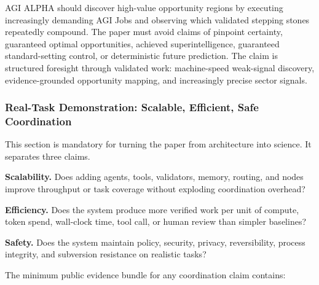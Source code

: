 AGI ALPHA should discover high-value opportunity regions by executing
increasingly demanding AGI Jobs and observing which validated stepping
stones repeatedly compound. The paper must avoid claims of pinpoint
certainty, guaranteed optimal opportunities, achieved superintelligence,
guaranteed standard-setting control, or deterministic future prediction.
The claim is structured foresight through validated work: machine-speed
weak-signal discovery, evidence-grounded opportunity mapping, and
increasingly precise sector signals.

\subsubsection{Real-Task Demonstration: Scalable, Efficient, Safe
Coordination}\label{real-task-demonstration-scalable-efficient-safe-coordination}

This section is mandatory for turning the paper from architecture into
science. It separates three claims.

\textbf{Scalability.} Does adding agents, tools, validators, memory,
routing, and nodes improve throughput or task coverage without exploding
coordination overhead?

\textbf{Efficiency.} Does the system produce more verified work per unit
of compute, token spend, wall-clock time, tool call, or human review
than simpler baselines?

\textbf{Safety.} Does the system maintain policy, security, privacy,
reversibility, process integrity, and subversion resistance on realistic
tasks?

The minimum public evidence bundle for any coordination claim contains:

\begin{Shaded}
\begin{Highlighting}[]
\end{Highlighting}
\end{Shaded}

